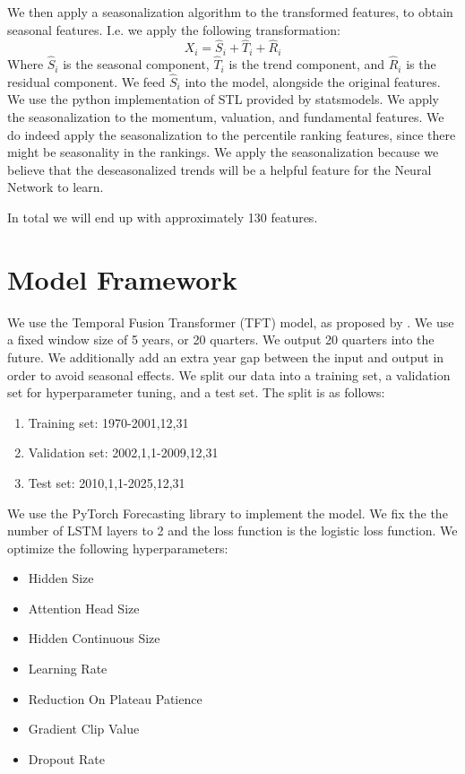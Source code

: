 \documentclass[AER]{AEA}
\begin{document}
We then apply a seasonalization algorithm to the transformed features, to obtain seasonal features. 
I.e. we apply the following transformation:
\[
X_i = \hat{S}_i + \hat{T}_i + \hat{R}_i
\]
Where $\hat{S}_i$ is the seasonal component, $\hat{T}_i$ is the trend component, and $\hat{R}_i$ is the residual component.
We feed $\hat{S}_i$ into the model, alongside the original features.
We use the python implementation of STL provided by statsmodels.
We apply the seasonalization to the momentum, valuation, and fundamental features. 
We do indeed apply the seasonalization to the percentile ranking features, since there might be seasonality in the rankings.
We apply the seasonalization because we believe that the deseasonalized trends will be a helpful feature for the Neural Network to learn.

In total we will end up with approximately 130 features.
\section{Model Framework}
We use the Temporal Fusion Transformer (TFT) model, as proposed by \cite{tft}. 
We use a fixed window size of 5 years, or 20 quarters. We output 20 quarters into the future. 
We additionally add an extra year gap between the input and output in order to avoid seasonal effects.
We split our data into a training set, a validation set for hyperparameter tuning, and a test set.
The split is as follows:
\begin{enumerate}
    \item Training set: 1970-2001,12,31
    \item Validation set: 2002,1,1-2009,12,31
    \item Test set: 2010,1,1-2025,12,31
\end{enumerate}
We use the PyTorch Forecasting library to implement the model.
We fix the the number of LSTM layers to 2 and the loss function is the logistic loss function.
We optimize the following hyperparameters:
\begin{itemize}
    \item Hidden Size
    \item Attention Head Size
    \item Hidden Continuous Size
    \item Learning Rate
    \item Reduction On Plateau Patience
    \item Gradient Clip Value
    \item Dropout Rate
\end{itemize}
\end{document}
